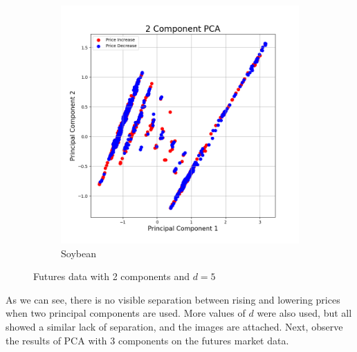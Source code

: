\documentclass{article}
\begin{document}
\begin{figure}[h!]
\begin{subfigure}{.5\textwidth}
  \includegraphics[scale=.3]{imagesmid/soymkt5}
\caption{Soybean}
\end{subfigure}
\caption{Futures data with 2 components and $d=5$}
\end{figure}

As we can see, there is no visible separation between rising and lowering prices when two principal components are used.  More values of $d$ were also used, but all showed a similar lack of separation, and the images are attached.  Next, observe the results of PCA with 3 components on the futures market data.  
\end{document}
